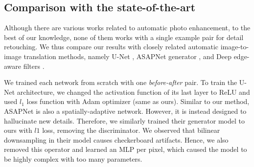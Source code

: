 \subsection{Comparison with the state-of-the-art}
\label{sec:Comparisons}


Although there are various works related to automatic photo enhancement, to the best of our knowledge, none of them works with a single example pair for detail retouching. We thus compare our results with closely related automatic image-to-image translation methods, namely U-Net \cite{ronneberger2015u}, ASAPNet generator \cite{shaham2021spatially}, and Deep edge-aware filters \cite{xu2015deep}. 

We trained each network from scratch with one \textit{before-after} pair. To train the U-Net architecture, we changed the activation function of its last layer to ReLU and used $l_1$ loss function with Adam optimizer (same as ours). Similar to our method, ASAPNet is also a spatially-adaptive network. However, it is instead designed to hallucinate new details. Therefore, we similarly trained their generator model to ours with $l1$ loss, removing the discriminator. We observed that bilinear downsampling in their model causes checkerboard artifacts. Hence, we also removed this operator and learned an MLP per pixel, which caused the model to be highly complex with too many parameters. 


